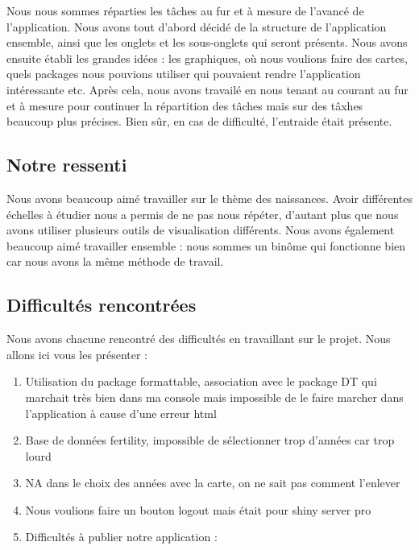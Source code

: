 \documentclass[
]{article}
\providecommand{\tightlist}{%
  \setlength{\itemsep}{0pt}\setlength{\parskip}{0pt}}
\begin{document}
Nous nous sommes réparties les tâches au fur et à mesure de l'avancé de
l'application. Nous avons tout d'abord décidé de la structure de
l'application ensemble, ainsi que les onglets et les sous-onglets qui
seront présents. Nous avons ensuite établi les grandes idées : les
graphiques, où nous voulions faire des cartes, quels packages nous
pouvions utiliser qui pouvaient rendre l'application intéressante etc.
Après cela, nous avons travailé en nous tenant au courant au fur et à
mesure pour continuer la répartition des tâches mais sur des tâxhes
beaucoup plus précises. Bien sûr, en cas de difficulté, l'entraide était
présente.

\hypertarget{notre-ressenti}{%
\subsection{Notre ressenti}\label{notre-ressenti}}

Nous avons beaucoup aimé travailler sur le thème des naissances. Avoir
différentes échelles à étudier nous a permis de ne pas nous répéter,
d'autant plus que nous avons utiliser plusieurs outils de visualisation
différents. Nous avons également beaucoup aimé travailler ensemble :
nous sommes un binôme qui fonctionne bien car nous avons la même méthode
de travail.

\hypertarget{difficultuxe9s-rencontruxe9es}{%
\subsection{Difficultés
rencontrées}\label{difficultuxe9s-rencontruxe9es}}

Nous avons chacune rencontré des difficultés en travaillant sur le
projet. Nous allons ici vous les présenter :

\begin{enumerate}
\def\labelenumi{\arabic{enumi}.}
\tightlist
\item
  Utilisation du package formattable, association avec le package DT qui
  marchait très bien dans ma console mais impossible de le faire marcher
  dans l'application à cause d'une erreur html
\item
  Base de données fertility, impossible de sélectionner trop d'années
  car trop lourd
\item
  NA dans le choix des années avec la carte, on ne sait pas comment
  l'enlever
\item
  Nous voulions faire un bouton logout mais était pour shiny server pro
\item
  Difficultés à publier notre application :
\end{enumerate}
\end{document}
